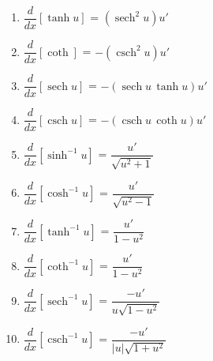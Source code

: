 \documentclass[10pt]{article}
\newcommand{\ddx}[1]{ $ \dfrac{d}{dx} \left[ #1 \right] $ }
\newcommand{\m}[1]{ $ \displaystyle #1 $ }
\DeclareMathOperator{\sech}{sech}
\DeclareMathOperator{\csch}{csch}
\begin{document}
\begin{center}
{\begin{minipage}{0.98\textwidth}
\begin{multicols}{3}
\begin{enumerate}
		\item \ddx{\tanh u } = \m{(\sech^2 u) u'}
		\item \ddx{\coth} = \m{-(\csch^2 u)u'}
		\item \ddx{\sech u} = \m{-(\sech u \, \tanh u)u'}
		\item \ddx{\csch u} = \m{-(\csch u\, \coth u)u'}
		\item \ddx{\sinh^{-1} u} = \m{\dfrac{u'}{\sqrt{u^2 + 1}}}
		\item \ddx{\cosh^{-1} u} = \m{\dfrac{u'}{\sqrt{u^2 - 1}}}
		\item \ddx{\tanh^{-1} u} = \m{\dfrac{u'}{1 - u^2}}
		\item \ddx{\coth^{-1} u} = \m{\dfrac{u'}{1 - u^2}}
		\item \ddx{\sech^{-1} u} = \m{\dfrac{-u'}{u \sqrt{1 - u^2}}}
		\item \ddx{\csch^{-1} u} = \m{\dfrac{-u'}{| u | \sqrt{1 + u^2}}}
	\end{enumerate}\end{multicols}


\end{minipage}}
\end{center}
\end{document}
